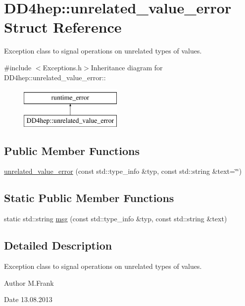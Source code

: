 \hypertarget{struct_d_d4hep_1_1unrelated__value__error}{
\section{DD4hep::unrelated\_\-value\_\-error Struct Reference}
\label{struct_d_d4hep_1_1unrelated__value__error}
}


Exception class to signal operations on unrelated types of values.  


{\ttfamily \#include $<$Exceptions.h$>$}Inheritance diagram for DD4hep::unrelated\_\-value\_\-error::\begin{figure}[H]
\begin{center}
\leavevmode
\includegraphics[height=2cm]{struct_d_d4hep_1_1unrelated__value__error}
\end{center}
\end{figure}
\subsection*{Public Member Functions}
\begin{DoxyCompactItemize}
\item 
\hyperlink{struct_d_d4hep_1_1unrelated__value__error_adb6fa7ac7ea37b8575dd0550a197555b}{unrelated\_\-value\_\-error} (const std::type\_\-info \&typ, const std::string \&text=\char`\"{}\char`\"{})
\end{DoxyCompactItemize}
\subsection*{Static Public Member Functions}
\begin{DoxyCompactItemize}
\item 
static std::string \hyperlink{struct_d_d4hep_1_1unrelated__value__error_aa0d34096b68f05f08f3dbe3a875e8cda}{msg} (const std::type\_\-info \&typ, const std::string \&text)
\end{DoxyCompactItemize}


\subsection{Detailed Description}
Exception class to signal operations on unrelated types of values. \begin{DoxyAuthor}{Author}
M.Frank 
\end{DoxyAuthor}
\begin{DoxyDate}{Date}
13.08.2013 
\end{DoxyDate}


